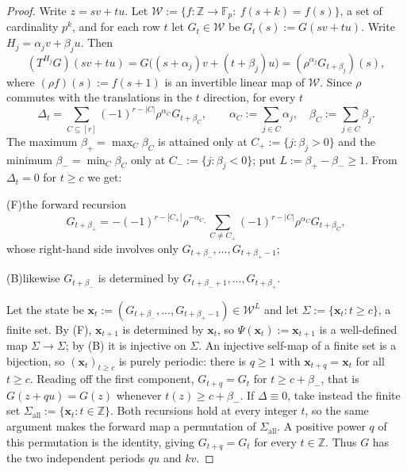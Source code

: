 \documentclass[11pt,reqno]{amsart}
\theoremstyle{plain}
\theoremstyle{definition}
\theoremstyle{remark}
\theoremstyle{plain}
\theoremstyle{remark}
\theoremstyle{definition}
\numberwithin{equation}{section}
\newcommand{\Z}{\mathbb{Z}}
\newcommand{\Fp}{\mathbb{F}_p}
\newcommand{\cW}{\mathcal{W}}
\begin{document}
\begin{proof}
Write $z=sv+tu$.  Let $\cW:=\{f\colon\Z\to\Fp:\ f(s+k)=f(s)\}$, a set of
cardinality $p^k$, and for each row $t$ let $G_t\in\cW$ be
$G_t(s):=G(sv+tu)$.  Write $H_j=\alpha_jv+\beta_ju$.  Then
\[(T^{H_j}G)(sv+tu)=G\bigl((s+\alpha_j)v+(t+\beta_j)u\bigr)
  =(\rho^{\alpha_j}G_{t+\beta_j})(s),\]
where $(\rho f)(s):=f(s+1)$ is an invertible linear map of $\cW$.  Since $\rho$
commutes with the translations in the $t$ direction, for every $t$
\[\Delta_t=\sum_{C\subseteq[r]}(-1)^{r-|C|}\rho^{\alpha_C}G_{t+\beta_C},\qquad
  \alpha_C:=\sum_{j\in C}\alpha_j,\quad\beta_C:=\sum_{j\in C}\beta_j .\]
The maximum $\beta_+=\max_C\beta_C$ is attained only at
$C_+:=\{j:\beta_j>0\}$ and the minimum $\beta_-=\min_C\beta_C$ only at
$C_-:=\{j:\beta_j<0\}$; put $L:=\beta_+-\beta_-\ge1$.  From $\Delta_t=0$ for
$t\ge c$ we get:

\smallskip
\noindent\textup{(F)}\quad the forward recursion
\[G_{t+\beta_+}=-(-1)^{r-|C_+|}\rho^{-\alpha_{C_+}}\sum_{C\ne C_+}(-1)^{r-|C|}
 \rho^{\alpha_C}G_{t+\beta_C},\]
whose right-hand side involves only $G_{t+\beta_-},\dots,G_{t+\beta_+-1}$;

\noindent\textup{(B)}\quad likewise $G_{t+\beta_-}$ is determined by
$G_{t+\beta_-+1},\dots,G_{t+\beta_+}$.

\smallskip
Let the state be $\mathbf x_t:=(G_{t+\beta_-},\dots,G_{t+\beta_+-1})\in\cW^L$
and let $\Sigma:=\{\mathbf x_t:t\ge c\}$, a finite set.  By (F), $\mathbf
x_{t+1}$ is determined by $\mathbf x_t$, so $\Psi(\mathbf x_t):=\mathbf x_{t+1}$
is a well-defined map $\Sigma\to\Sigma$; by (B) it is injective on $\Sigma$.  An
injective self-map of a finite set is a bijection, so
$(\mathbf x_t)_{t\ge c}$ is purely periodic: there is $q\ge1$ with
$\mathbf x_{t+q}=\mathbf x_t$ for all $t\ge c$.  Reading off the first
component, $G_{t+q}=G_t$ for $t\ge c+\beta_-$, that is $G(z+qu)=G(z)$ whenever
$t(z)\ge c+\beta_-$.  If $\Delta\equiv0$, take instead the finite set
$\Sigma_{\mathrm{all}}:=\{\mathbf x_t:t\in\Z\}$.  Both recursions hold at every
integer $t$, so the same argument makes the forward map a permutation of
$\Sigma_{\mathrm{all}}$.  A positive power $q$ of this permutation is the
identity, giving $G_{t+q}=G_t$ for every $t\in\Z$.  Thus $G$ has the two
independent periods $qu$ and $kv$.
\end{proof}
\end{document}
